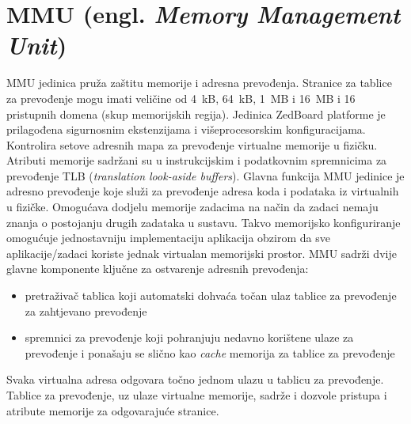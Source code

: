 \documentclass[times, utf8, diplomski, numeric]{fer}
\begin{document}
\section{MMU (engl. \textit{Memory Management Unit})}
MMU jedinica pruža zaštitu memorije i adresna prevođenja. Stranice za tablice za prevođenje mogu imati veličine od 4~kB,
64~kB, 1~MB i 16~MB i 16 pristupnih domena (skup memorijskih regija). Jedinica ZedBoard platforme je prilagođena sigurnosnim
ekstenzijama i višeprocesorskim konfiguracijama. Kontrolira setove adresnih mapa za prevođenje virtualne memorije u fizičku.
Atributi memorije sadržani su u instrukcijskim i podatkovnim spremnicima za prevođenje TLB (\textit{translation look-aside
buffers}). Glavna funkcija MMU jedinice je adresno prevođenje koje služi za prevođenje adresa koda i podataka iz virtualnih u
fizičke. Omogućava dodjelu memorije zadacima na način da zadaci nemaju znanja o postojanju drugih zadataka u sustavu. Takvo
memorijsko konfiguriranje omogućuje jednostavniju implementaciju aplikacija obzirom da sve aplikacije/zadaci koriste jednak
virtualan memorijski prostor. MMU sadrži dvije glavne komponente ključne za ostvarenje adresnih prevođenja:
\begin{itemize}
  \item{pretraživač tablica koji automatski dohvaća točan ulaz tablice za prevođenje za zahtjevano prevođenje}
  \item{spremnici za prevođenje koji pohranjuju nedavno korištene ulaze za prevođenje i ponašaju se slično kao \textit{cache}
  memorija za tablice za prevođenje}
\end{itemize}
Svaka virtualna adresa odgovara točno jednom ulazu u tablicu za prevođenje. Tablice za prevođenje, uz ulaze virtualne memorije,
sadrže i dozvole pristupa i atribute memorije za odgovarajuće stranice.
\end{document}
